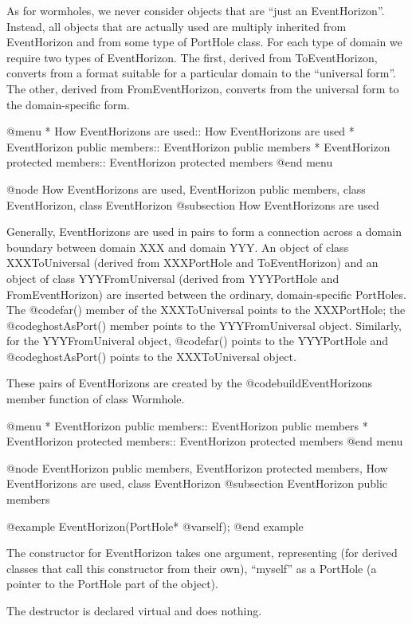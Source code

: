 As for wormholes, we never consider objects that are ``just an
EventHorizon''.  Instead, all objects that are actually used are multiply
inherited from EventHorizon and from some type of PortHole class.  For
each type of domain we require two types of EventHorizon.  The first, derived
from ToEventHorizon, converts from a format suitable for a particular
domain to the ``universal form''.  The other, derived from FromEventHorizon,
converts from the universal form to the domain-specific form.

@menu
* How EventHorizons are used::  How EventHorizons are used
* EventHorizon public members::  EventHorizon public members
* EventHorizon protected members::  EventHorizon protected members
@end menu

@node How EventHorizons are used, EventHorizon public members, class EventHorizon, class EventHorizon
@subsection How EventHorizons are used

Generally, EventHorizons are used in pairs to form a connection
across a domain boundary between domain XXX and domain YYY.  An object
of class XXXToUniversal (derived from XXXPortHole and ToEventHorizon)
and an object of class YYYFromUniversal (derived from YYYPortHole and
FromEventHorizon) are inserted between the ordinary, domain-specific
PortHoles.  The @code{far()} member of the XXXToUniversal points
to the XXXPortHole; the @code{ghostAsPort()} member points to
the YYYFromUniversal object.  Similarly, for the YYYFromUniveral
object, @code{far()} points to the YYYPortHole and @code{ghostAsPort()}
points to the XXXToUniversal object.

These pairs of EventHorizons are created by the
@code{buildEventHorizons} member function of class Wormhole.

@menu
* EventHorizon public members::  EventHorizon public members
* EventHorizon protected members::  EventHorizon protected members
@end menu

@node EventHorizon public members, EventHorizon protected members, How EventHorizons are used, class EventHorizon
@subsection EventHorizon public members

@example
EventHorizon(PortHole* @var{self});
@end example

The constructor for EventHorizon takes one argument, representing (for
derived classes that call this constructor from their own), ``myself'' as
a PortHole (a pointer to the PortHole part of the object).

The destructor is declared virtual and does nothing.

